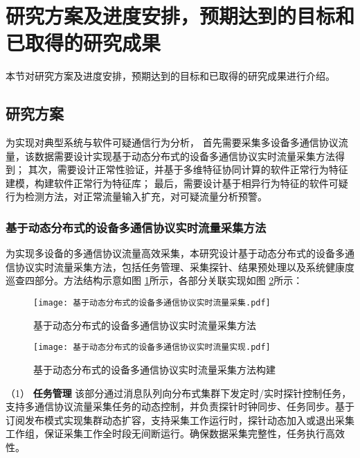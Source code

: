 
\section{研究方案及进度安排，预期达到的目标和已取得的研究成果}
本节对研究方案及进度安排，预期达到的目标和已取得的研究成果进行介绍。
\subsection{研究方案}

为实现对典型系统与软件可疑通信行为分析，
首先需要采集多设备多通信协议流量，该数据需要设计实现基于动态分布式的设备多通信协议实时流量采集方法得到；
其次，需要设计正常性验证，并基于多维特征协同计算的软件正常行为特征建模，构建软件正常行为特征库；
最后，需要设计基于相异行为特征的软件可疑行为检测方法，对正常流量输入扩充，对可疑流量分析预警。


\subsubsection{基于动态分布式的设备多通信协议实时流量采集方法}
\FloatBarrier

为实现多设备的多通信协议流量高效采集，本研究设计基于动态分布式的设备多通信协议实时流量采集方法，包括任务管理、采集探针、结果预处理以及系统健康度巡查四部分。方法结构示意如图 \ref{fig:基于动态分布式的设备多通信协议实时流量采集方法}所示，各部分关联实现如图 \ref{fig:基于动态分布式的设备多通信协议实时流量采集方法构建}所示：

 
\begin{figure}[ht]
  \centering
  \texttt{[image: 基于动态分布式的设备多通信协议实时流量采集.pdf]}
  \caption{基于动态分布式的设备多通信协议实时流量采集方法}
  \label{fig:基于动态分布式的设备多通信协议实时流量采集方法}
\end{figure} 

\begin{figure}[ht]
  \centering
  \texttt{[image: 基于动态分布式的设备多通信协议实时流量实现.pdf]}
  \caption{基于动态分布式的设备多通信协议实时流量采集方法构建}
  \label{fig:基于动态分布式的设备多通信协议实时流量采集方法构建}
\end{figure} 


（1） \textbf{任务管理}\quad
该部分通过消息队列向分布式集群下发定时/实时探针控制任务，支持多通信协议流量采集任务的动态控制，并负责探针时钟同步、任务同步。基于订阅发布模式实现集群动态扩容，支持采集工作运行时，探针动态加入或退出采集工作组，保证采集工作全时段无间断运行。确保数据采集完整性，任务执行高效性。

